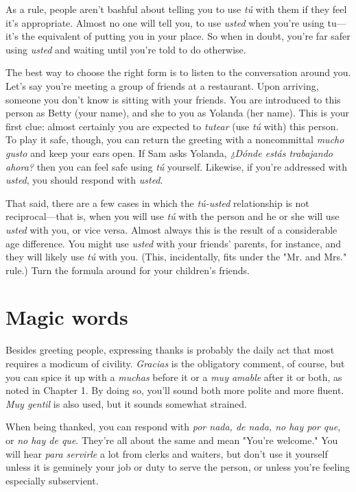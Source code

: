 \documentclass[14pt,a4paper,oneside]{memoir}
\begin{document}
As a rule, people aren't bashful about telling you to use \emph{tú}
with them if they feel it's appropriate. Almost no one will tell you, to
use \emph{usted} when you're using tu---it's the equivalent of putting you in
your place. So when in doubt, you're far safer using \emph{usted} and waiting
until you're told to do otherwise.

The best way to choose the right form is to listen to the conversation around you. Let's say you're meeting a group of friends at a
restaurant. Upon arriving, someone you don't know is sitting with
your friends. You are introduced to this person as Betty (your name),
and she to you as Yolanda (her name). This is your first clue: almost
certainly you are expected to \emph{tutear} (use \emph{tú} with) this person. To play
it safe, though, you can return the greeting with a noncommittal \emph{mucho gusto} and keep your ears open. If Sam asks Yolanda, \emph{¿Dónde estás
	trabajando ahora?} then you can feel safe using \emph{tú} yourself. Likewise, if
you're addressed with \emph{usted}, you should respond with \emph{usted}.

That said, there are a few cases in which the \emph{tú-usted} relationship is not reciprocal---that is, when you will use \emph{tú} with the person
and he or she will use \emph{usted} with you, or vice versa. Almost always
this is the result of a considerable age difference. You might use \emph{usted}
with your friends' parents, for instance, and they will likely use \emph{tú}
with you. (This, incidentally, fits under the "Mr. and Mrs." rule.) Turn
the formula around for your children's friends.

\section{Magic words}

Besides greeting people, expressing thanks is probably the
daily act that most requires a modicum of civility. \emph{Gracias} is the
obligatory comment, of course, but you can spice it up with a \emph{muchas}
before it or a \emph{muy amable} after it or both, as noted in Chapter 1. By
doing so, you'll sound both more polite and more fluent. \emph{Muy gentil} is
also used, but it sounds somewhat strained.

When being thanked, you can respond with \emph{por nada, de
	nada, no hay por que}, or \emph{no hay de que}. They're all about the same
and mean "You're welcome." You will hear \emph{para servirle} a lot from
clerks and waiters, but don't use it yourself unless it is genuinely
your job or duty to serve the person, or unless you're feeling especially subservient.
\end{document}
